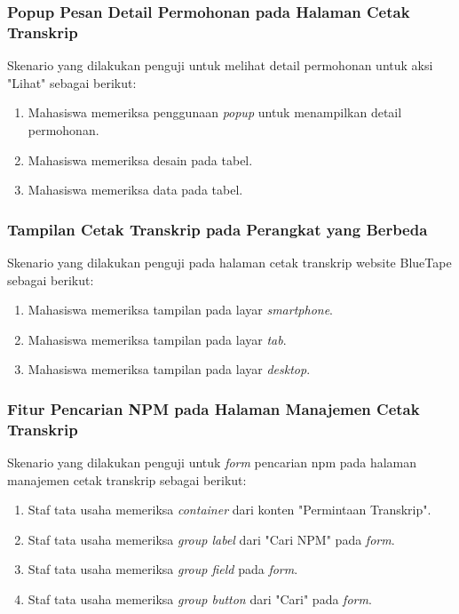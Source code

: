 \subsubsection{Popup Pesan Detail Permohonan pada Halaman Cetak Transkrip}
Skenario yang dilakukan penguji untuk melihat detail permohonan untuk aksi "Lihat" sebagai berikut:
\begin{enumerate}
	\item Mahasiswa memeriksa penggunaan \textit{popup} untuk menampilkan detail permohonan.
	\item Mahasiswa memeriksa desain pada tabel.
	\item Mahasiswa memeriksa data pada tabel.
\end{enumerate}

\subsubsection{Tampilan Cetak Transkrip pada Perangkat yang Berbeda}
Skenario yang dilakukan penguji pada halaman cetak transkrip website BlueTape sebagai berikut:
\begin{enumerate}
	\item Mahasiswa memeriksa tampilan pada layar \textit{smartphone}. 	
	\item Mahasiswa memeriksa tampilan pada layar \textit{tab}.
	\item Mahasiswa memeriksa tampilan pada layar \textit{desktop}.
\end{enumerate}

\subsubsection{Fitur Pencarian NPM pada Halaman Manajemen Cetak Transkrip}
Skenario yang dilakukan penguji untuk \textit{form} pencarian npm pada halaman manajemen cetak transkrip sebagai berikut:
\begin{enumerate}
	\item Staf tata usaha memeriksa \textit{container} dari konten "Permintaan Transkrip".
	\item Staf tata usaha memeriksa \textit{group label} dari "Cari NPM" pada \textit{form}.	
	\item Staf tata usaha memeriksa \textit{group field} pada \textit{form}.	
	\item Staf tata usaha memeriksa \textit{group button} dari "Cari" pada \textit{form}.
\end{enumerate}


